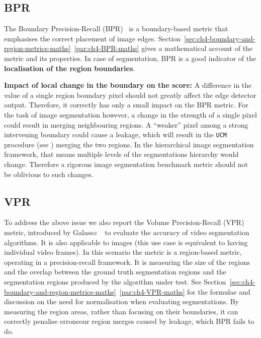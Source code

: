 \subsection{BPR}
\label{sec:ch5-BPR-evaluation-metric}
The Boundary Precision-Recall (BPR)~\cite{Arbelaez11} is a boundary-based metric that emphasises the correct placement of image edges. Section~\ref*{sec:ch4-boundary-and-region-metrics-maths}~\ref{par:ch4-BPR-maths} %
gives a mathematical account of %
the metric and its properties. In case of segmentation, BPR is a good indicator of the {\bf localisation of the region boundaries}.

\textbf{Impact of %
local change in the boundary on the score:} A difference in the value of a single region boundary pixel should not greatly affect the edge detector output. Therefore, it correctly has only a small impact on the BPR metric. For the task of image segmentation however, a change in the strength of a single pixel could result in merging neighbouring regions. A ``weaker'' pixel among a strong intervening boundary could cause %
a leakage, which will result in %
the {\tt UCM} procedure %
(see %
) %
merging the two regions. In the hierarchical image segmentation framework, that means multiple levels of the segmentations hierarchy would change. Therefore a rigorous image segmentation benchmark metric should not be oblivious to such changes.

\subsection{VPR}
To address the above issue we also report the Volume Precision-Recall (VPR) metric, introduced by Galasso \etal~\cite{Galasso13} to evaluate the accuracy of video segmentation algorithms. It is also applicable to images (this use case is equivalent to having individual video frames). In this scenario the metric is a region-based metric, operating %
in %
a precision-recall framework. It is measuring the size of the regions and the overlap between the ground truth segmentation regions and the segmentation regions produced by the algorithm under test. 
See Section~\ref*{sec:ch4-boundary-and-region-metrics-maths}~\ref{par:ch4-VPR-maths} for the formulae and discussion on the need for normalisation when evaluating segmentations. By measuring the region areas, rather than focusing on their boundaries, it can correctly penalise erroneour region merges caused by leakage, which BPR fails to do.

